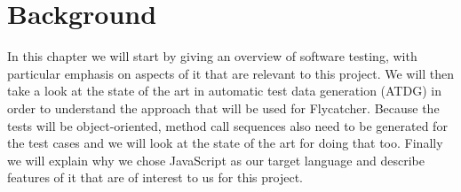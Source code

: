 \documentclass[a4paper,11pt,titlepage]{report}
\begin{document}


\chapter{Background}
In this chapter we will start by giving an overview of software testing, with particular emphasis on aspects of it that are relevant to this project. We will then take a look at the state of the art in automatic test data generation (ATDG) in order to understand the approach that will be used for \textsf{Flycatcher}. Because the tests will be object-oriented, method call sequences also need to be generated for the test cases and we will look at the state of the art for doing that too. Finally we will explain why we chose JavaScript as our target language and describe features of it that are of interest to us for this project.
\end{document}
